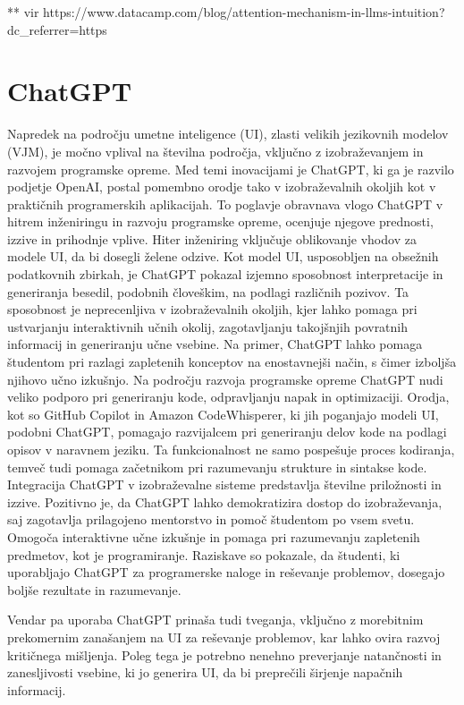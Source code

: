 \documentclass[12pt,a4paper]{book}
\begin{document}
** vir https://www.datacamp.com/blog/attention-mechanism-in-llms-intuition?dc_referrer=https%
\cite{vaswani2023attention}

\cite{KASNECI2023102274}




\section{ChatGPT}

Napredek na področju umetne inteligence (UI), zlasti velikih jezikovnih modelov (VJM), je močno vplival na številna področja, vključno z izobraževanjem in razvojem programske opreme. Med temi inovacijami je ChatGPT, ki ga je razvilo podjetje OpenAI, postal pomembno orodje tako v izobraževalnih okoljih kot v praktičnih programerskih aplikacijah. To poglavje obravnava vlogo ChatGPT v hitrem inženiringu in razvoju programske opreme, ocenjuje njegove prednosti, izzive in prihodnje vplive.
Hiter inženiring vključuje oblikovanje vhodov za modele UI, da bi dosegli želene odzive. Kot model UI, usposobljen na obsežnih podatkovnih zbirkah, je ChatGPT pokazal izjemno sposobnost interpretacije in generiranja besedil, podobnih človeškim, na podlagi različnih pozivov. Ta sposobnost je neprecenljiva v izobraževalnih okoljih, kjer lahko pomaga pri ustvarjanju interaktivnih učnih okolij, zagotavljanju takojšnjih povratnih informacij in generiranju učne vsebine. Na primer, ChatGPT lahko pomaga študentom pri razlagi zapletenih konceptov na enostavnejši način, s čimer izboljša njihovo učno izkušnjo.
Na področju razvoja programske opreme ChatGPT nudi veliko podporo pri generiranju kode, odpravljanju napak in optimizaciji. Orodja, kot so GitHub Copilot in Amazon CodeWhisperer, ki jih poganjajo modeli UI, podobni ChatGPT, pomagajo razvijalcem pri generiranju delov kode na podlagi opisov v naravnem jeziku. Ta funkcionalnost ne samo pospešuje proces kodiranja, temveč tudi pomaga začetnikom pri razumevanju strukture in sintakse kode.
Integracija ChatGPT v izobraževalne sisteme predstavlja številne priložnosti in izzive. Pozitivno je, da ChatGPT lahko demokratizira dostop do izobraževanja, saj zagotavlja prilagojeno mentorstvo in pomoč študentom po vsem svetu. Omogoča interaktivne učne izkušnje in pomaga pri razumevanju zapletenih predmetov, kot je programiranje. Raziskave so pokazale, da študenti, ki uporabljajo ChatGPT za programerske naloge in reševanje problemov, dosegajo boljše rezultate in razumevanje.

Vendar pa uporaba ChatGPT prinaša tudi tveganja, vključno z morebitnim prekomernim zanašanjem na UI za reševanje problemov, kar lahko ovira razvoj kritičnega mišljenja. Poleg tega je potrebno nenehno preverjanje natančnosti in zanesljivosti vsebine, ki jo generira UI, da bi preprečili širjenje napačnih informacij.
\cite{app13095783}
\end{document}
